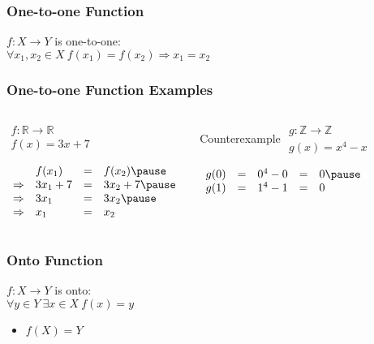\documentclass[dvipsnames]{beamer}
\begin{document}
\begin{frame}
  \frametitle{One-to-one Function}

  \begin{definition}
    $f: X \rightarrow Y$ is \alert{one-to-one}:\\
      $\forall x_1,x_2 \in X~f(x_1)=f(x_2) \Rightarrow x_1=x_2$
  \end{definition}
\end{frame}

\begin{frame}
  \frametitle{One-to-one Function Examples}

  \begin{columns}[t]
    \begin{example}
      $\begin{array}{l}
        f: \mathbb{R} \rightarrow \mathbb{R}\\
        f(x) = 3x + 7
      \end{array}$

      \pause
      \bigskip
      $\begin{array}{llll}
                    & f(x_1)    & = & f(x_2)\pause\\
        \Rightarrow & 3 x_1 + 7 & = & 3 x_2 + 7\pause\\
        \Rightarrow & 3 x_1     & = & 3 x_2\pause\\
        \Rightarrow & x_1       & = & x_2
      \end{array}$
    \end{example}

    \pause
    \begin{block}{Counterexample}
      $\begin{array}{l}
        g: \mathbb{Z} \rightarrow \mathbb{Z}\\
        g(x) = x^4 - x
      \end{array}$

      \pause
      \bigskip
      $\begin{array}{lllll}
        g(0) & = & 0^4 - 0 & = & 0\pause\\
        g(1) & = & 1^4 - 1 & = & 0
      \end{array}$
    \end{block}
  \end{columns}
\end{frame}

\begin{frame}
  \frametitle{Onto Function}

  \begin{definition}
    $f: X \rightarrow Y$ is \alert{onto}:\\
    $\forall y \in Y~\exists x \in X~f(x)=y$
  \end{definition}

  \pause
  \begin{itemize}
    \item $f(X)=Y$
  \end{itemize}
\end{frame}
\end{document}
